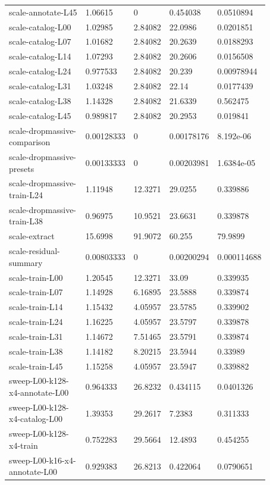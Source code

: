 \begin{longtable}{@{}L{0.39\linewidth}L{0.11\linewidth}L{0.12\linewidth}L{0.12\linewidth}L{0.13\linewidth}@{}}
scale-annotate-L45 & 1.06615 & 0 & 0.454038 & 0.0510894 \\
scale-catalog-L00 & 1.02985 & 2.84082 & 22.0986 & 0.0201851 \\
scale-catalog-L07 & 1.01682 & 2.84082 & 20.2639 & 0.0188293 \\
scale-catalog-L14 & 1.07293 & 2.84082 & 20.2606 & 0.0156508 \\
scale-catalog-L24 & 0.977533 & 2.84082 & 20.239 & 0.00978944 \\
scale-catalog-L31 & 1.03248 & 2.84082 & 22.14 & 0.0177439 \\
scale-catalog-L38 & 1.14328 & 2.84082 & 21.6339 & 0.562475 \\
scale-catalog-L45 & 0.989817 & 2.84082 & 20.2953 & 0.019841 \\
scale-dropmassive-comparison & 0.00128333 & 0 & 0.00178176 & \mbox{8.192e-06} \\
scale-dropmassive-presets & 0.00133333 & 0 & 0.00203981 & \mbox{1.6384e-05} \\
scale-dropmassive-train-L24 & 1.11948 & 12.3271 & 29.0255 & 0.339886 \\
scale-dropmassive-train-L38 & 0.96975 & 10.9521 & 23.6631 & 0.339878 \\
scale-extract & 15.6998 & 91.9072 & 60.255 & 79.9899 \\
scale-residual-summary & 0.00803333 & 0 & 0.00200294 & 0.000114688 \\
scale-train-L00 & 1.20545 & 12.3271 & 33.09 & 0.339935 \\
scale-train-L07 & 1.14928 & 6.16895 & 23.5888 & 0.339874 \\
scale-train-L14 & 1.15432 & 4.05957 & 23.5785 & 0.339902 \\
scale-train-L24 & 1.16225 & 4.05957 & 23.5797 & 0.339878 \\
scale-train-L31 & 1.14672 & 7.51465 & 23.5791 & 0.339874 \\
scale-train-L38 & 1.14182 & 8.20215 & 23.5944 & 0.33989 \\
scale-train-L45 & 1.15258 & 4.05957 & 23.5947 & 0.339882 \\
sweep-L00-k128-x4-annotate-L00 & 0.964333 & 26.8232 & 0.434115 & 0.0401326 \\
sweep-L00-k128-x4-catalog-L00 & 1.39353 & 29.2617 & 7.2383 & 0.311333 \\
sweep-L00-k128-x4-train & 0.752283 & 29.5664 & 12.4893 & 0.454255 \\
sweep-L00-k16-x4-annotate-L00 & 0.929383 & 26.8213 & 0.422064 & 0.0790651 \\

\end{longtable}
